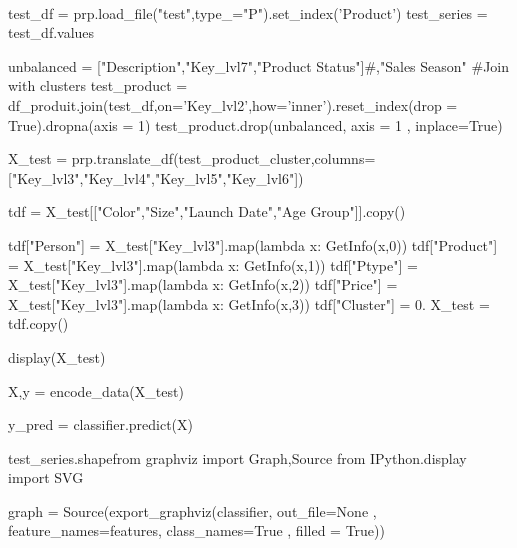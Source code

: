 \documentclass[11pt]{article}
\begin{document}
    \begin{center}
    \end{center}
    { \hspace*{\fill} \\}
    
    

    

    

    

    

    

    

    

    

    

    

    

    

    

    

    

    

    

    
test_df = prp.load_file("test",type_="P").set_index('Product')
test_series = test_df.values



unbalanced = ["Description","Key_lvl7","Product Status"]#,"Sales Season"
#Join with clusters
test_product = df_produit.join(test_df,on='Key_lvl2',how='inner').reset_index(drop = True).dropna(axis = 1)
test_product.drop(unbalanced, axis = 1 , inplace=True)



X_test = prp.translate_df(test_product_cluster,columns=["Key_lvl3","Key_lvl4","Key_lvl5","Key_lvl6"])


tdf = X_test[["Color","Size","Launch Date","Age Group"]].copy()

tdf["Person"] = X_test["Key_lvl3"].map(lambda x: GetInfo(x,0))
tdf["Product"] = X_test["Key_lvl3"].map(lambda x: GetInfo(x,1))
tdf["Ptype"] = X_test["Key_lvl3"].map(lambda x: GetInfo(x,2))
tdf["Price"] = X_test["Key_lvl3"].map(lambda x: GetInfo(x,3))
tdf["Cluster"] = 0.
X_test = tdf.copy()

display(X_test)

X,y = encode_data(X_test)

y_pred = classifier.predict(X)


test_series.shapefrom graphviz import Graph,Source
from IPython.display import SVG

graph = Source(export_graphviz(classifier, out_file=None
   , feature_names=features, class_names=True
   , filled = True))
\end{document}
